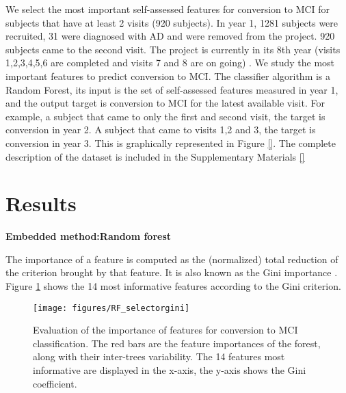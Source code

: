 \documentclass[preprint,12pt]{elsarticle}
\begin{document}
We select the most important self-assessed features for conversion to MCI for subjects that have at least 2 visits (920 subjects). In year 1, 1281 subjects were recruited, 31 were diagnosed with AD and were removed from the project. 920 subjects came to the second visit. The project is currently in its  8th year (visits 1,2,3,4,5,6 are completed and visits 7 and 8 are on going) . We study the most important features to predict conversion to MCI. The classifier algorithm is a Random Forest, its input is the set of self-assessed features measured in year 1, and the output target is conversion to MCI for the latest available visit. For example, a subject that came to only the first and second visit, the target is conversion in year 2. A subject that came to visits 1,2 and 3, the target is conversion in year 3. This is graphically represented in Figure \ref{}.
The complete description of the dataset is included in the Supplementary Materials \ref{}


\section{Results}
\label{se:res}




\textbf{Embedded method:Random forest}

The importance of a feature is computed as the (normalized) total reduction of the criterion brought by that feature. It is also known as the Gini importance \cite{breiman2017classification}.
Figure \ref{fig:RF_selectorgini} shows the 14 most informative features according to the Gini criterion.

\begin{figure}[!htb]
        \centering
        \texttt{[image: figures/RF\_selectorgini]}
        \caption{Evaluation of the importance of features for conversion to MCI classification. The red bars are the feature importances of the forest, along with their inter-trees variability. The 14 features most informative are displayed in the x-axis, the y-axis shows the Gini coefficient.} 
        \label{fig:RF_selectorgini}
\end{figure}
\end{document}
